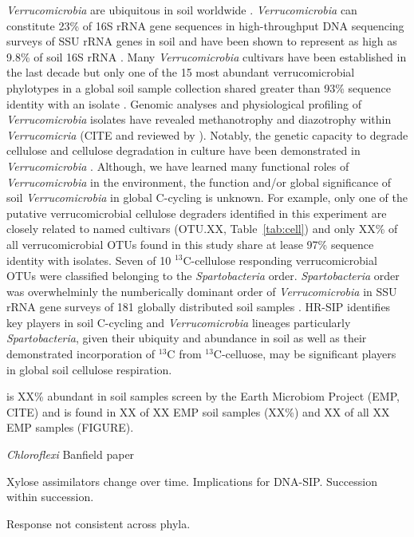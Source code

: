 \textit{Verrucomicrobia} are ubiquitous in soil worldwide
\citep{Bergmann_2011}.  \textit{Verrucomicrobia} can constitute 23\% of 16S
rRNA gene sequences in high-throughput DNA sequencing surveys of SSU rRNA genes
in soil \citep{Bergmann_2011} and have been shown to represent as high as 9.8\%
of soil 16S rRNA \citep{Buckley_2001}. Many \textit{Verrucomicrobia} cultivars
have been established in the last decade \cite{Wertz_2011} but only one of the
15 most abundant verrucomicrobial phylotypes in a global soil sample collection
shared greater than 93\% sequence identity with an isolate
\citep{Bergmann_2011}.  Genomic analyses and physiological profiling of
\textit{Verrucomicrobia} isolates have revealed methanotrophy and diazotrophy
\citep{Wertz_2011} within \textit{Verrucomicria} (CITE and reviewed by
\citet{Wertz_2011}). Notably, the genetic capacity to degrade cellulose and
cellulose degradation in culture have been demonstrated in
\textit{Verrucomicrobia} \citep{Otsuka_2012, Wertz_2011}.  Although, we have
learned many functional roles of \textit{Verrucomicrobia} in the environment,
the function and/or global significance of soil \textit{Verrucomicrobia} in
global C-cycling is unknown. For example, only one of the putative
verrucomicrobial cellulose degraders identified in this experiment are closely
related to named cultivars (OTU.XX, Table~\ref{tab:cell}) and only XX\% of all
verrucomicrobial OTUs found in this study share at lease 97\% sequence identity
with isolates. Seven of 10 $^{13}$C-cellulose responding verrucomicrobial OTUs were
classified belonging to the \textit{Spartobacteria} order.  \textit{Spartobacteria}
order was overwhelminly the numberically dominant order of \textit{Verrucomicrobia} in
SSU rRNA gene surveys of 181 globally distributed soil samples
\citep{Bergmann_2011}. HR-SIP identifies key players in soil C-cycling and
\textit{Verrucomicrobia} lineages particularly \textit{Spartobacteria}, given
their ubiquity and abundance in soil as well as their demonstrated
incorporation of $^{13}$C from $^{13}$C-celluose, may be significant players in
global soil cellulose respiration. 

is XX\% abundant in soil samples screen by the Earth Microbiom Project (EMP, CITE) and is
found in XX of XX EMP soil samples (XX\%) and XX of all XX EMP samples (FIGURE). 

\textit{Chloroflexi} Banfield paper

Xylose assimilators change over time. Implications for DNA-SIP. Succession within succession.

Response not consistent across phyla.

